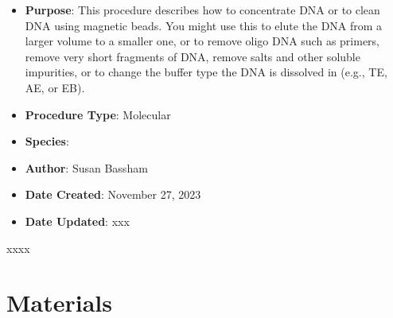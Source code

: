 \documentclass[
  letterpaper,
  DIV=11,
  numbers=noendperiod]{scrreprt}
\providecommand{\tightlist}{%
  \setlength{\itemsep}{0pt}\setlength{\parskip}{0pt}}\usepackage{longtable,booktabs,array}
\begin{document}
\begin{itemize}
\tightlist
\item
  \textbf{Purpose}: This procedure describes how to concentrate DNA or
  to clean DNA using magnetic beads. You might use this to elute the DNA
  from a larger volume to a smaller one, or to remove oligo DNA such as
  primers, remove very short fragments of DNA, remove salts and other
  soluble impurities, or to change the buffer type the DNA is dissolved
  in (e.g., TE, AE, or EB).
\item
  \textbf{Procedure Type}: Molecular
\item
  \textbf{Species}:
\item
  \textbf{Author}: Susan Bassham
\item
  \textbf{Date Created}: November 27, 2023
\item
  \textbf{Date Updated}: xxx
\end{itemize}

\begin{tcolorbox}[enhanced jigsaw, rightrule=.15mm, title=\textcolor{quarto-callout-warning-color}{\faExclamationTriangle}\hspace{0.5em}{NOTES}, titlerule=0mm, opacitybacktitle=0.6, toprule=.15mm, bottomrule=.15mm, opacityback=0, left=2mm, colframe=quarto-callout-warning-color-frame, breakable, coltitle=black, colback=white, colbacktitle=quarto-callout-warning-color!10!white, bottomtitle=1mm, leftrule=.75mm, toptitle=1mm, arc=.35mm]

xxxx

\end{tcolorbox}

\hypertarget{materials-19}{%
\section{Materials}\label{materials-19}}
\end{document}
